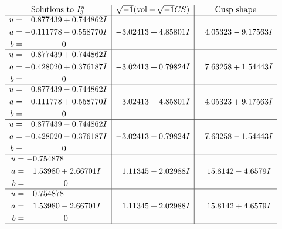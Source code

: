 \documentclass[1p]{elsarticle_modified}
\theoremstyle{definition}
\newcommand{\I}{\sqrt{-1}}
\begin{document}
$$\begin{array}{c|c|c}  
\text{Solutions to }I^u_{3}& \I (\text{vol} + \sqrt{-1}CS) & \text{Cusp shape}\\
 \hline 
\begin{aligned}
u &= \phantom{-}0.877439 + 0.744862 I \\
a &= -0.111778 - 0.558770 I \\
b &= \phantom{-0.000000 } 0\end{aligned}
 & -3.02413 + 4.85801 I & \phantom{-}4.05323 - 9.17563 I \\ \hline\begin{aligned}
u &= \phantom{-}0.877439 + 0.744862 I \\
a &= -0.428020 + 0.376187 I \\
b &= \phantom{-0.000000 } 0\end{aligned}
 & -3.02413 + 0.79824 I & \phantom{-}7.63258 + 1.54443 I \\ \hline\begin{aligned}
u &= \phantom{-}0.877439 - 0.744862 I \\
a &= -0.111778 + 0.558770 I \\
b &= \phantom{-0.000000 } 0\end{aligned}
 & -3.02413 - 4.85801 I & \phantom{-}4.05323 + 9.17563 I \\ \hline\begin{aligned}
u &= \phantom{-}0.877439 - 0.744862 I \\
a &= -0.428020 - 0.376187 I \\
b &= \phantom{-0.000000 } 0\end{aligned}
 & -3.02413 - 0.79824 I & \phantom{-}7.63258 - 1.54443 I \\ \hline\begin{aligned}
u &= -0.754878\phantom{ +0.000000I} \\
a &= \phantom{-}1.53980 + 2.66701 I \\
b &= \phantom{-0.000000 } 0\end{aligned}
 & \phantom{-}1.11345 - 2.02988 I & \phantom{-}15.8142 - 4.6579 I \\ \hline\begin{aligned}
u &= -0.754878\phantom{ +0.000000I} \\
a &= \phantom{-}1.53980 - 2.66701 I \\
b &= \phantom{-0.000000 } 0\end{aligned}
 & \phantom{-}1.11345 + 2.02988 I & \phantom{-}15.8142 + 4.6579 I\\
 \hline 
 \end{array}$$\newpage\newpage\renewcommand{\arraystretch}{1}
\end{document}
